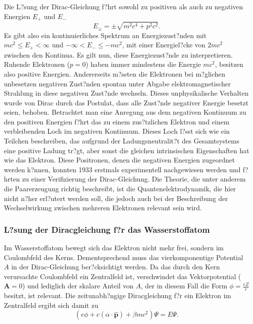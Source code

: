 Die L?sung der Dirac-Gleichung f?hrt sowohl zu positiven als auch zu negativen Energien $E_+$ und $E_-$
\begin{equation}
E_\pm = \pm \sqrt{m^2c^4+p^2c^2}.
\end{equation}
Es gibt also ein kontinuierliches Spektrum an Energiezust?nden mit $mc^2\le E_+<\infty$ und $-\infty<E_-\le -mc^2$, mit einer Energiel?cke von $2mc^2$ zwischen den Kontinua. Es gilt nun, diese Energiezust?nde zu interpretieren. Ruhende Elektronen ($p=0$) haben immer mindestens die Energie $mc^2$, besitzen also positive Energien. Andererseits m?ssten die Elektronen bei m?glichen unbesetzen negativen Zust?nden spontan unter Abgabe elektromagnetischer Strahlung in diese negativen Zust?nde wechseln. Dieses unphysikalische Verhalten wurde von Dirac durch das Postulat, dass alle Zust?nde negativer Energie besetzt seien, behoben. Betrachtet man eine Anregung aus dem negativen Kontinuum zu den positiven Energien f?hrt das zu einem zus?tzlichen Elektron und einem verbleibenden Loch im negativen Kontinuum. Dieses Loch l?sst sich wie ein Teilchen beschreiben, das aufgrund der Ladungsneutralit?t des Gesamtsystems eine positive Ladung tr?gt, aber sonst die gleichen intrinsischen Eigenschaften hat wie das Elektron. Diese Positronen, denen die negativen Energien zugeordnet werden k?nnen, konnten 1933 erstmals experimentell nachgewiesen werden\cite{Anderson33} und f?hrten zu einer Verifizierung der Dirac-Gleichung. Die Theorie, die unter anderem die Paarerzeugung richtig beschreibt, ist die Quantenelektrodynamik, die hier nicht n?her erl?utert werden soll, die jedoch auch bei der Beschreibung der Wechselwirkung zwischen mehreren Elektronen relevant sein wird.


\subsubsection{L?sung der Diracgleichung f?r das Wasserstoffatom}\label{hatom}
Im Wasserstoffatom bewegt sich das Elektron nicht mehr frei, sondern im Coulombfeld des Kerns. Dementsprechend muss das vierkomponentige Potential $A$ in der Dirac-Gleichung ber?cksichtigt werden. Da das durch den Kern verursachte Coulombfeld ein Zentralfeld ist, verschwindet das Vektorpotential ($\mathbf{A}=0$) und lediglich der skalare Anteil von $A$, der in diesem Fall die Form $\phi=\frac{eZ}r$ besitzt, ist relevant.
Die zeitunabh?ngige Diracgleichung f?r ein Elektron im Zentralfeld ergibt sich damit zu
\begin{equation}
\left(e\phi + c(\alpha\cdot\hat{\mathbf{p}})+\beta mc^2\right) \Psi = E \Psi.
\end{equation}

